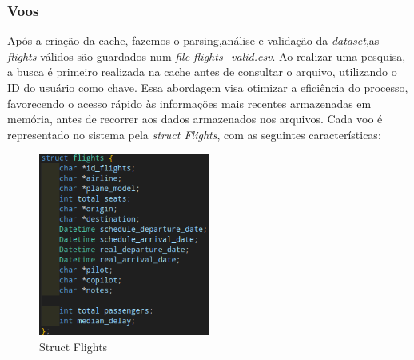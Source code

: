 \documentclass[11pt]{article}
\begin{document}
\subsubsection{Voos}

    Após a criação da cache, fazemos o parsing,análise e validação da \textit{dataset},as \textit{flights} válidos são guardados num \textit{file flights_valid.csv}. Ao realizar uma pesquisa, a busca é primeiro realizada na cache antes de consultar o arquivo, utilizando o ID do usuário como chave. Essa abordagem visa otimizar a eficiência do processo, favorecendo o acesso rápido às informações mais recentes armazenadas em memória, antes de recorrer aos dados armazenados nos arquivos.
    Cada voo é representado no sistema pela \textit{struct Flights}, com as seguintes características:

    \begin{figure}[hbt!]
        \centering
        \includegraphics[width=0.5\textwidth]{Imagens/struct flights.png}
        \caption{Struct Flights}
        \label{fig:example}
    \end{figure}
    
\end{document}
